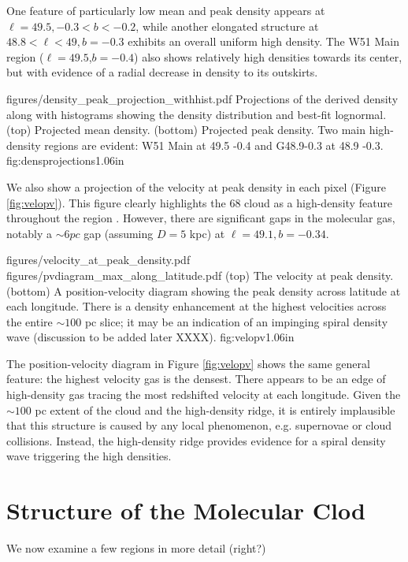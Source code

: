 One feature of particularly low mean and peak density appears at $\ell=49.5,
-0.3<b<-0.2$, while another elongated structure at $48.8<\ell<49, b=-0.3$
exhibits an overall uniform high density.  The W51 Main region
($\ell=49.5$,$b=-0.4$) also shows relatively high densities towards its center,
but with evidence of a radial decrease in density to its outskirts.


            {figures/density_peak_projection_withhist.pdf}
{Projections of the derived density along with histograms
showing the density distribution and best-fit lognormal.
(top) Projected mean density.
(bottom) Projected peak density.
Two main high-density regions are evident: W51 Main at 49.5 -0.4 and G48.9-0.3 at 48.9 -0.3.}
{fig:densprojections}{1.0}{6in}

We also show a projection of the velocity at peak density in each pixel (Figure
\ref{fig:velopv}).  This figure clearly highlights the 68 \kms cloud as a
high-density feature throughout the region \citep{Carpenter1998a}.  However,
there are significant gaps in the molecular gas, notably a $\sim6 pc$ gap
(assuming $D=5$ kpc) at $\ell=49.1, b=-0.34$.

\FigureTwoAA
{figures/velocity_at_peak_density.pdf}
{figures/pvdiagram_max_along_latitude.pdf}
{(top) The velocity at peak density.
 (bottom) A position-velocity diagram showing the peak density across latitude
 at each longitude.  There is a density enhancement at the highest velocities
 across the entire $\sim100$ pc slice; it may be an indication of an impinging 
 spiral density wave (discussion to be added later XXXX).
}
{fig:velopv}{1.0}{6in}

The position-velocity diagram in Figure \ref{fig:velopv} shows the same general
feature: the highest velocity gas is the densest.  There appears to be an edge
of high-density gas tracing the most redshifted velocity at each longitude.
Given the $\sim100$ pc extent of the cloud and the high-density ridge, it is
entirely implausible that this structure is caused by any local phenomenon,
e.g. supernovae or cloud collisions.  Instead, the high-density ridge provides
evidence for a spiral density wave triggering the high densities.

\section{Structure of the Molecular Clod}
We now examine a few regions in more detail (right?)

